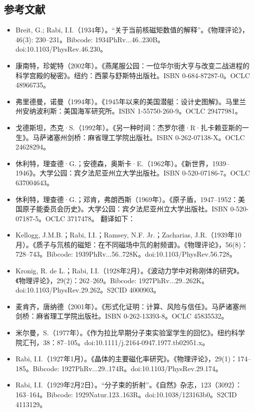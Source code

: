 \subsection{参考文献}
\begin{itemize}
\item Breit, G.; Rabi, I.I.（1934年）。“关于当前核磁矩数值的解释”。《物理评论》，46(3): 230–231。Bibcode: 1934PhRv...46..230B。doi:10.1103/PhysRev.46.230。
\item 康南特，珍妮特（2002年）。《燕尾服公园：一位华尔街大亨与改变二战进程的科学宫殿的秘密》。纽约：西蒙与舒斯特出版社。ISBN 0-684-87287-0。OCLC 48966735。
\item 弗里德曼，诺曼（1994年）。《1945年以来的美国潜艇：设计史图解》。马里兰州安纳波利斯：美国海军研究所。ISBN 1-55750-260-9。OCLC 29477981。
\item 戈德斯坦，杰克·S.（1992年）。《另一种时间：杰罗尔德·R·扎卡赖亚斯的一生》。马萨诸塞州剑桥：麻省理工学院出版社。ISBN 0-262-07138-X。OCLC 24628294。
\item 休利特，理查德·G.；安德森，奥斯卡·E.（1962年）。《新世界，1939–1946》。大学公园：宾夕法尼亚州立大学出版社。ISBN 0-520-07186-7。OCLC 637004643。
\item 休利特，理查德·G.；邓肯，弗朗西斯（1969年）。《原子盾，1947–1952：美国原子能委员会历史》。大学公园：宾夕法尼亚州立大学出版社。ISBN 0-520-07187-5。OCLC 3717478。
翻译如下：
\item Kellogg, J.M.B.；Rabi, I.I.；Ramsey, N.F. Jr.；Zacharias, J.R.（1939年10月）。《质子与氘核的磁矩：在不同磁场中氘的射频谱》。《物理评论》，56(8)：728–743。Bibcode: 1939PhRv...56..728K。doi:10.1103/PhysRev.56.728。
\item Kronig, R. de L.；Rabi, I.I.（1928年2月）。《波动力学中对称刚体的研究》。《物理评论》，29(2)：262–269。Bibcode: 1927PhRv...29..262K。doi:10.1103/PhysRev.29.262。S2CID 4000903。
\item 麦肯齐，唐纳德（2001年）。《形式化证明：计算、风险与信任》。马萨诸塞州剑桥：麻省理工学院出版社。ISBN 0-262-13393-8。OCLC 45835532。
\item 米尔曼，S.（1977年）。《作为拉比早期分子束实验室学生的回忆》。纽约科学院汇刊，38：87–105。doi:10.1111/j.2164-0947.1977.tb02951.x。
\item Rabi, I.I.（1927年1月）。《晶体的主要磁化率研究》。《物理评论》，29(1)：174–185。Bibcode: 1927PhRv...29..174R。doi:10.1103/PhysRev.29.174。
\item Rabi, I.I.（1929年2月2日）。“分子束的折射”。《自然》杂志，123（3092）：163–164。Bibcode: 1929Natur.123..163R。doi:10.1038/123163b0。S2CID 4113129。

\end{itemize}
